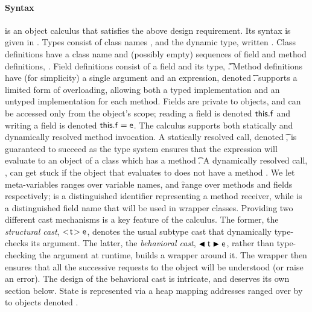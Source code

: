 \documentclass[acmsmall, anonymous, authordraft, review]{acmart} %
\begin{document}
\paragraph{Syntax}  
\kafka is an object calculus that satisfies the above design
requirement. Its syntax is given in .  Types consist of class
names \C, \D and the dynamic type, written \any.  Class definitions have a
class name and (possibly empty) sequences of field and method definitions,
\Class{}. Field definitions consist of a field and its
type, \Fdef\f\t. Method definitions have (for simplicity) a single argument
and an expression, denoted \Mdef\m\x\t\t\e.  \kafka supports a limited form
of overloading, allowing both a typed implementation and an untyped
implementation for each method.  Fields are private to objects, and can be
accessed only from the object's scope; reading a field is denoted
\(\FRead\f\) and writing a field is denoted \(\FWrite\f\e \).  The calculus
supports both statically and dynamically resolved method invocation.  A
statically resolved call, denoted \KCall\e\m\ep\t\tp, is guaranteed to
succeed as the type system ensures that the expression \e will evaluate to
an object of a class which has a method \Mtype\m\t\tp. A dynamically
resolved call, \DynCall\e\m\ep, can get stuck if the object that \e
evaluates to does not have a method \Mtype\m\any\any.  We let meta-variables
\x ranges over variable names, \m and \f range over methods and fields
respectively; \this is a distinguished identifier representing a method
receiver, while \that is a distinguished field name that will be used in
wrapper classes.  Providing two different cast mechanisms is a key feature
of the calculus.  The former, the \emph{structural cast}, \(\SubCast\t\e\),
denotes the usual subtype cast that dynamically type-checks its argument.
The latter, the \emph{behavioral cast}, \(\BehCast\t\e\), rather than
type-checking the argument at runtime, builds a wrapper around it.  The
wrapper then ensures that all the successive requests to the object will be
understood (or raise an error). The design of the behavioral cast is
intricate, and deserves its own section below.  State is represented via a
heap \s mapping addresses ranged over by \a to objects
denoted \hspace{-1mm}\obj{}.
\end{document}
